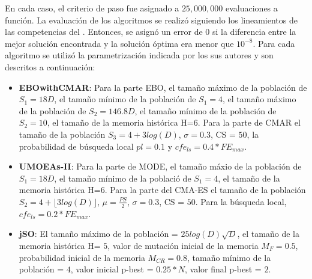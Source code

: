 En cada caso, el criterio de paso fue asignado a $25,000,000$ evaluaciones a función.
%
La evaluación de los algoritmos se realizó siguiendo los lineamientos de las competencias del \CEC{}.
%
Entonces, se asignó un error de $0$ si la diferencia entre la mejor solución encontrada y la solución óptima era menor que $10^{-8}$.
%
%
Para cada algoritmo se utilizó la parametrización indicada por los sus autores y son descritos a continuación:
\begin{itemize}
\item \textbf{EBOwithCMAR}: Para la parte EBO, el tamaño máximo de la población de $S_1 = 18D$, el tamaño mínimo de la población de $S_1 = 4$, el tamaño máximo de la población de $S_2 = 146.8D$, el tamaño mínimo de la población de $S_2 = 10$, el tamaño de la memoria histórica H=$6$. Para la parte de CMAR el tamaño de la población $S_3 = 4 + 3log(D)$, $\sigma=0.3$, CS = $50$, la probabilidad de búsqueda local $pl = 0.1$ y $cfe_{ls} = 0.4* FE_{max}$.
\item \textbf{UMOEAs-II}: Para la parte de MODE, el tamaño máxio de la población de $S_1 = 18D$, el tamaño mínimo de la població de $S_1 = 4$, el tamaño de la memoria histórica H=$6$. Para la parte del CMA-ES el tamaño de la población $S_2 = 4 + \lfloor 3log(D) \rfloor$, $\mu=\frac{PS}{2}$, $\sigma=0.3$, CS = $50$. Para la búsqueda local, $cfe_{ls} = 0.2 * FE_{max}$.
\item \textbf{jSO}: El tamaño máximo de la población = $25log(D)\sqrt{D}$, el tamaño de la memoria histórica H= $5$, valor de mutación inicial de la memoria $M_F = 0.5$, probabilidad inicial de la memoria $M_{CR} = 0.8$, tamaño mínimo de la población = $4$, valor inicial p-best = $0.25*N$, valor final p-best = $2$.

\end{itemize}
